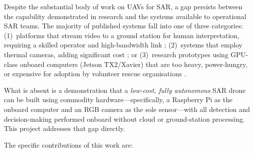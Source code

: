Despite the substantial body of work on UAVs for SAR, a gap persists between the capability demonstrated in research and the systems available to operational SAR teams. The majority of published systems fall into one of three categories: (1)~platforms that stream video to a ground station for human interpretation, requiring a skilled operator and high-bandwidth link \cite{goodrich2008}; (2)~systems that employ thermal cameras, adding significant cost \cite{thermal_sar, sarreview}; or (3)~research prototypes using GPU-class onboard computers (Jetson TX2/Xavier) that are too heavy, power-hungry, or expensive for adoption by volunteer rescue organisations \cite{tijtgat2017, anwar2020}.

What is absent is a demonstration that a \textit{low-cost, fully autonomous} SAR drone can be built using commodity hardware---specifically, a Raspberry Pi as the onboard computer and an RGB camera as the sole sensor---with all detection and decision-making performed onboard without cloud or ground-station processing. This project addresses that gap directly.

The specific contributions of this work are:

